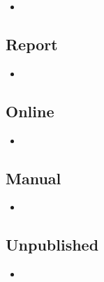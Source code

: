 \begin{itemize}
\item {}
\end{itemize}

\subsection{Report}

\begin{itemize}
\item {}
\end{itemize}


\subsection{Online}

\begin{itemize}
\item {}
\end{itemize}

\subsection{Manual}

\begin{itemize}
\item {}
\end{itemize}

\subsection{Unpublished}

\begin{itemize}
\item {}
\end{itemize}

